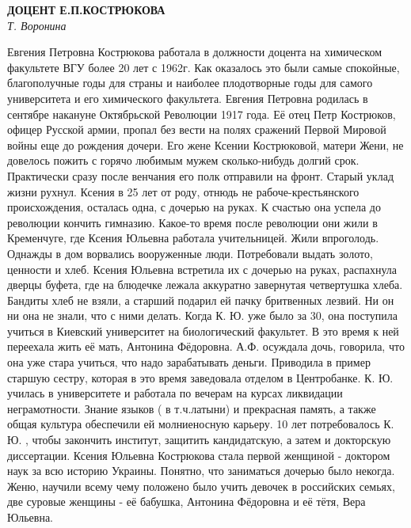 \begin{center}{ \bf  ДОЦЕНТ Е.П.КОСТРЮКОВА}\\
{\it Т. Воронина} \\
\end{center}

Евгения Петровна Кострюкова работала в должности доцента на химическом факультете ВГУ более 20 лет с 1962г. Как оказалось это были самые спокойные, благополучные годы для страны и наиболее плодотворные годы для самого университета и его химического факультета.
Евгения Петровна родилась в сентябре накануне Октябрьской Революции 1917 года. Её отец Петр Кострюков, офицер Русской армии, пропал без вести на полях сражений Первой Мировой войны еще до рождения дочери. Его жене Ксении Кострюковой, матери Жени, не довелось пожить с горячо любимым мужем сколько-нибудь долгий срок. Практически сразу после венчания его полк отправили на фронт.
Старый уклад жизни рухнул. Ксения в 25 лет от роду, отнюдь не рабоче-крестьянского происхождения, осталась одна, с дочерью на руках. К счастью она успела до революции кончить гимназию. Какое-то время после революции они жили в Кременчуге, где Ксения Юльевна работала учительницей. Жили впроголодь. Однажды в дом ворвались вооруженные люди. Потребовали выдать золото, ценности и хлеб. Ксения Юльевна встретила их с дочерью на руках, распахнула дверцы буфета, где на блюдечке лежала аккуратно завернутая четвертушка хлеба. Бандиты хлеб не взяли, а старший подарил ей пачку бритвенных лезвий. Ни он ни она не знали, что с ними делать.
Когда К. Ю. уже было за 30, она поступила учиться в Киевский университет на биологический факультет. В это время к ней переехала жить её мать, Антонина Фёдоровна. А.Ф. осуждала дочь, говорила, что она уже стара учиться, что надо зарабатывать деньги. Приводила в пример старшую сестру, которая в это время заведовала отделом в Центробанке. К. Ю. училась в университете и работала по вечерам на курсах ликвидации неграмотности. Знание языков ( в т.ч.латыни) и прекрасная память, а также общая культура обеспечили ей молниеносную карьеру. 10 лет потребовалось К. Ю. , чтобы закончить институт, защитить кандидатскую, а затем и докторскую диссертации. Ксения Юльевна Кострюкова стала первой женщиной - доктором наук за всю историю Украины.
Понятно, что заниматься дочерью было некогда. Женю, научили всему чему положено было учить девочек в российских семьях, две суровые женщины - её бабушка, Антонина Фёдоровна и её тётя, Вера Юльевна.

